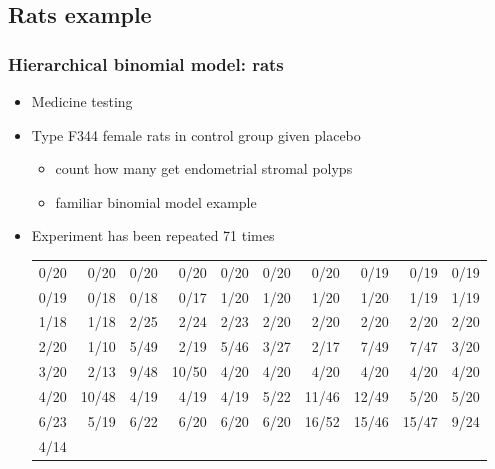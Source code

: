 \documentclass[10pt]{beamer}
\begin{document}
\subsection{Rats example}

\begin{frame}

\frametitle{Hierarchical binomial model: rats}

  \begin{itemize}
  \item Medicine testing
  \item Type F344 female rats in control group given placebo
    \begin{itemize}
    \item count how many get endometrial stromal polyps
    \item familiar binomial model example
    \end{itemize}
  \item<2-> Experiment has been repeated 71 times
    {\tiny
      \begin{tabular}{r r r r r r r r r r}
        0/20 & 0/20 & 0/20 & 0/20 & 0/20 & 0/20 & 0/20 & 0/19 & 0/19 & 0/19 \\
        0/19 & 0/18 & 0/18 & 0/17 & 1/20 & 1/20 & 1/20 & 1/20 & 1/19 & 1/19 \\
        1/18 & 1/18 & 2/25 & 2/24 & 2/23 & 2/20 & 2/20 & 2/20 & 2/20 & 2/20 \\
        2/20 & 1/10 & 5/49 & 2/19 & 5/46 & 3/27 & 2/17 & 7/49 & 7/47 & 3/20 \\
        3/20 & 2/13 & 9/48 & 10/50 & 4/20 & 4/20 & 4/20 & 4/20 & 4/20 & 4/20 \\
        4/20 & 10/48 & 4/19 & 4/19 & 4/19 & 5/22 & 11/46 & 12/49 & 5/20 & 5/20 \\
        6/23 & 5/19 & 6/22 & 6/20 & 6/20 & 6/20 & 16/52 & 15/46 & 15/47 & 9/24 \\
        4/14 &      &      &      &      &      &       &       &       &
      \end{tabular}}
  \end{itemize}

\end{frame}
\end{document}
